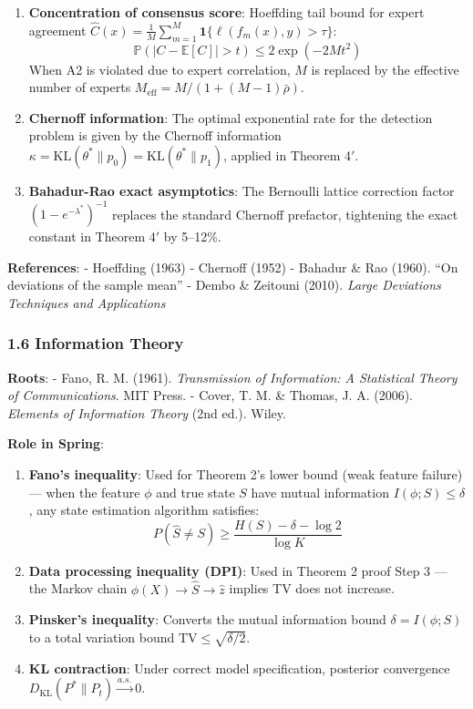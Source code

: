 \documentclass[
  12pt,
]{article}
\begin{document}
\begin{enumerate}
\def\labelenumi{\arabic{enumi}.}
\item
  \textbf{Concentration of consensus score}: Hoeffding tail bound for expert agreement $\hat{C}(x) = \frac{1}{M}\sum_{m=1}^M \mathbf{1}\{\ell(f_m(x), y) > \tau\}$:
  \[\mathbb{P}(|C - \mathbb{E}[C]| > t) \leq 2\exp(-2M t^2)\]
  When A2 is violated due to expert correlation, $M$ is replaced by the effective number of experts $M_{\text{eff}} = M/(1 + (M-1)\bar{\rho})$.
\item
  \textbf{Chernoff information}: The optimal exponential rate for the detection problem is given by the Chernoff information $\kappa = \text{KL}(\theta^*\|p_0) = \text{KL}(\theta^*\|p_1)$, applied in Theorem 4$'$.
\item
  \textbf{Bahadur-Rao exact asymptotics}: The Bernoulli lattice correction factor $(1-e^{-\lambda^*})^{-1}$ replaces the standard Chernoff prefactor, tightening the exact constant in Theorem 4$'$ by 5--12\%.
\end{enumerate}

\textbf{References}: - Hoeffding (1963) - Chernoff (1952) - Bahadur \& Rao (1960). ``On deviations of the sample mean'' - Dembo \& Zeitouni (2010). \emph{Large Deviations Techniques and Applications}

\subsubsection{1.6 Information Theory}\label{information-theory}

\textbf{Roots}: - Fano, R. M. (1961). \emph{Transmission of Information: A Statistical Theory of Communications}. MIT Press. - Cover, T. M. \& Thomas, J. A. (2006). \emph{Elements of Information Theory} (2nd ed.). Wiley.

\textbf{Role in Spring}:

\begin{enumerate}
\def\labelenumi{\arabic{enumi}.}
\item
  \textbf{Fano's inequality}: Used for Theorem 2's lower bound (weak feature failure) --- when the feature $\phi$ and true state $S$ have mutual information $I(\phi; S) \leq \delta$, any state estimation algorithm satisfies:
  \[P(\hat{S} \neq S) \geq \frac{H(S) - \delta - \log 2}{\log K}\]
\item
  \textbf{Data processing inequality (DPI)}: Used in Theorem 2 proof Step 3 --- the Markov chain $\phi(X) \to \hat{S} \to \hat{z}$ implies TV does not increase.
\item
  \textbf{Pinsker's inequality}: Converts the mutual information bound $\delta = I(\phi; S)$ to a total variation bound $\text{TV} \leq \sqrt{\delta/2}$.
\item
  \textbf{KL contraction}: Under correct model specification, posterior convergence $D_{\text{KL}}(P^* \| P_t) \xrightarrow{a.s.} 0$.
\end{enumerate}
\end{document}
